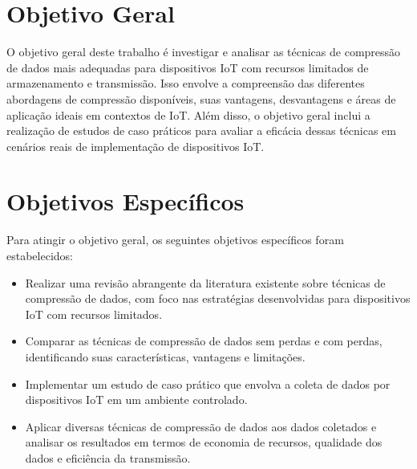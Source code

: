 \section{Objetivo Geral}
\label{sec:ObjGeral}

O objetivo geral deste trabalho é investigar e analisar as técnicas de compressão de dados mais adequadas para dispositivos IoT com recursos limitados de armazenamento e transmissão. Isso envolve a compreensão das diferentes abordagens de compressão disponíveis, suas vantagens, desvantagens e áreas de aplicação ideais em contextos de IoT. Além disso, o objetivo geral inclui a realização de estudos de caso práticos para avaliar a eficácia dessas técnicas em cenários reais de implementação de dispositivos IoT.

\section{Objetivos Específicos}
\label{sec:ObjEspecificos}

Para atingir o objetivo geral, os seguintes objetivos específicos foram estabelecidos:

\begin{itemize}
\item Realizar uma revisão abrangente da literatura existente sobre técnicas de compressão de dados, com foco nas estratégias desenvolvidas para dispositivos IoT com recursos limitados.
\item Comparar as técnicas de compressão de dados sem perdas e com perdas, identificando suas características, vantagens e limitações.
\item Implementar um estudo de caso prático que envolva a coleta de dados por dispositivos IoT em um ambiente controlado.
\item Aplicar diversas técnicas de compressão de dados aos dados coletados e analisar os resultados em termos de economia de recursos, qualidade dos dados e eficiência da transmissão.
\end{itemize}
